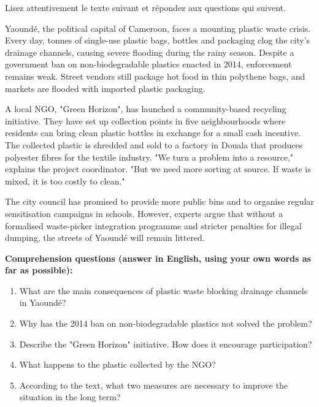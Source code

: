\documentclass[11pt]{article}
\begin{document}
\begin{exercice}
Lisez attentivement le texte suivant et répondez aux questions qui suivent.

\begin{textebox}
Yaoundé, the political capital of Cameroon, faces a mounting plastic waste crisis. Every day, tonnes of single-use plastic bags, bottles and packaging clog the city's drainage channels, causing severe flooding during the rainy season. Despite a government ban on non-biodegradable plastics enacted in 2014, enforcement remains weak. Street vendors still package hot food in thin polythene bags, and markets are flooded with imported plastic packaging.

A local NGO, "Green Horizon", has launched a community-based recycling initiative. They have set up collection points in five neighbourhoods where residents can bring clean plastic bottles in exchange for a small cash incentive. The collected plastic is shredded and sold to a factory in Douala that produces polyester fibres for the textile industry. "We turn a problem into a resource," explains the project coordinator. "But we need more sorting at source. If waste is mixed, it is too costly to clean."

The city council has promised to provide more public bins and to organise regular sensitisation campaigns in schools. However, experts argue that without a formalised waste-picker integration programme and stricter penalties for illegal dumping, the streets of Yaoundé will remain littered.
\end{textebox}

\textbf{Comprehension questions (answer in English, using your own words as far as possible):}
\begin{enumerate}
\item What are the main consequences of plastic waste blocking drainage channels in Yaoundé?
\item Why has the 2014 ban on non-biodegradable plastics not solved the problem?
\item Describe the "Green Horizon" initiative. How does it encourage participation?
\item What happens to the plastic collected by the NGO?
\item According to the text, what two measures are necessary to improve the situation in the long term?
\end{enumerate}


\end{exercice}
\end{document}
